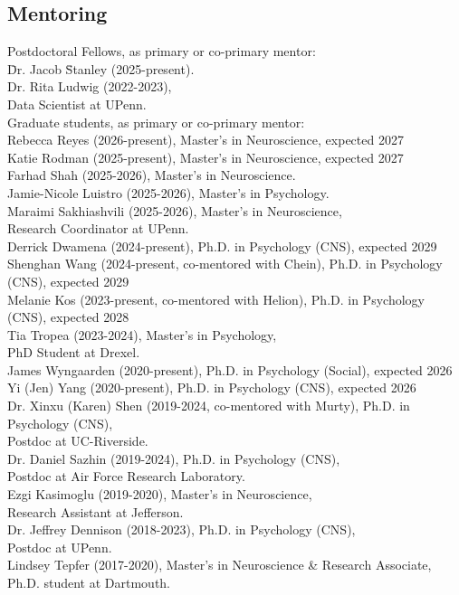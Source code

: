 \documentclass[11pt, letterpaper]{article}
\begin{document}
\subsection*{Mentoring}

\begin{tabbing}
Postdoctoral Fellows, as primary or co-primary mentor: \\  [.1cm]
\hspace{.5in} \= Dr. Jacob \= Stanley (2025-present). \\ 

\>  Dr. Rita Ludwig (2022-2023), \\ 
\> \> Data Scientist at UPenn. \\ [.2cm]


Graduate students, as primary or co-primary mentor: \\  [.1cm]
\> Rebecca Reyes (2026-present), Master's in Neuroscience, expected 2027 \\ 
\> Katie Rodman (2025-present), Master's in Neuroscience, expected 2027 \\ 
\> Farhad Shah (2025-2026), Master's in Neuroscience. \\ 
\> Jamie-Nicole Luistro  (2025-2026), Master's in Psychology. \\ 
\> Maraimi Sakhiashvili (2025-2026), Master's in Neuroscience, \\ 
\> \> Research Coordinator at UPenn. \\ 
\> Derrick Dwamena (2024-present), Ph.D. in Psychology (CNS), expected 2029 \\ 
\> Shenghan Wang (2024-present, co-mentored with Chein), Ph.D. in Psychology (CNS), expected 2029 \\ 
\> Melanie Kos (2023-present, co-mentored with Helion), Ph.D. in Psychology (CNS), expected 2028 \\ 
\> Tia Tropea (2023-2024), Master's in Psychology, \\ 
\> \> PhD Student at Drexel. \\ 
\> James Wyngaarden (2020-present), Ph.D. in Psychology (Social), expected 2026 \\
\> Yi (Jen) Yang (2020-present), Ph.D. in Psychology (CNS), expected 2026 \\
\> Dr. Xinxu (Karen) Shen (2019-2024, co-mentored with Murty), Ph.D. in Psychology (CNS), \\
\> \> Postdoc at UC-Riverside. \\ 
\> Dr. Daniel Sazhin (2019-2024), Ph.D. in Psychology (CNS), \\
\> \> Postdoc at Air Force Research Laboratory. \\ 
\> Ezgi Kasimoglu (2019-2020), Master's in Neuroscience, \\ 
\> \> Research Assistant at Jefferson. \\
\> Dr. Jeffrey Dennison (2018-2023), Ph.D. in Psychology (CNS), \\
\> \> Postdoc at UPenn. \\ 
\> Lindsey Tepfer (2017-2020), Master's in Neuroscience \& Research Associate, \\
\> \> Ph.D. student at Dartmouth. \\ [.2cm]


\end{tabbing}
\end{document}
